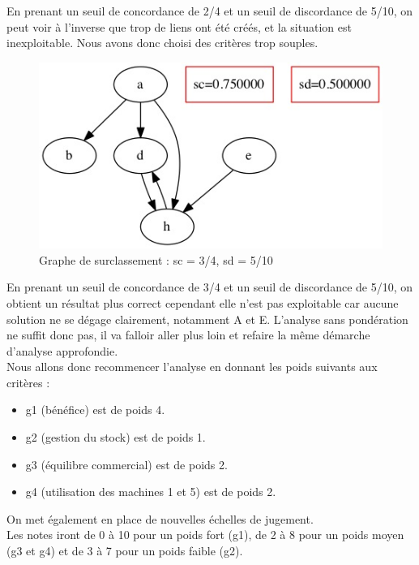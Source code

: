 En prenant un seuil de concordance de 2/4 et un seuil de discordance de 5/10,
on peut voir à l’inverse que trop de liens ont été créés, et la situation est
inexploitable. Nous avons donc choisi des critères trop souples. \\

\begin{figure}
    \begin{center}
        \includegraphics[scale=0.7]{partie3/graph_3_4_5_10.jpeg}
        \caption{Graphe de surclassement : sc = 3/4, sd = 5/10}
    \end{center}
\end{figure}

En prenant un seuil de concordance de 3/4 et un seuil de discordance de 5/10,
on obtient un résultat plus correct cependant elle n’est pas exploitable car
aucune solution ne se dégage clairement, notamment A et E. L’analyse sans
pondération ne suffit donc pas, il va falloir aller plus loin et refaire la
même démarche d’analyse approfondie. \\

Nous allons donc recommencer l’analyse en donnant les poids suivants aux critères : \\
\begin{itemize}
    \item g1 (bénéfice) est de poids 4.
    \item g2 (gestion du stock) est de poids 1.
    \item g3 (équilibre commercial) est de poids 2.
    \item g4 (utilisation des machines 1 et 5) est de poids 2.
\end{itemize}

On met également en place de nouvelles échelles de jugement. \\
Les notes iront de 0 à 10 pour un poids fort (g1), de 2 à 8 pour un poids moyen
(g3 et g4) et de 3 à 7 pour un poids faible (g2). \\

